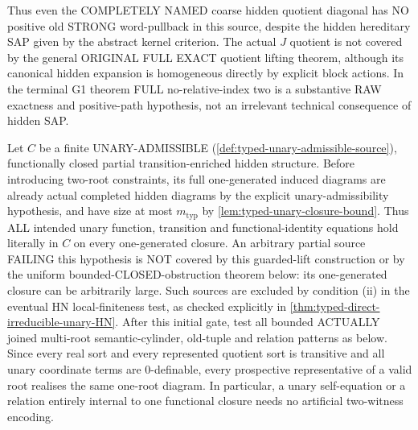 \begin{remark}
Thus even the
COMPLETELY NAMED coarse
hidden quotient diagonal
has NO positive old
STRONG word-pullback
in this source, despite
the hidden hereditary SAP
given by the abstract
kernel criterion.
The actual $J$ quotient
is not covered by the
general ORIGINAL FULL
EXACT quotient lifting
theorem, although its
canonical hidden expansion
is homogeneous directly
by explicit block actions.
In the terminal G1 theorem
FULL no-relative-index
two is a substantive
RAW exactness and
positive-path hypothesis,
not an irrelevant
technical consequence
of hidden SAP.
\end{remark}

\begin{construction}
\label{con:typed-guarded-lift}
Let \(C\) be a finite UNARY-ADMISSIBLE
(\cref{def:typed-unary-admissible-source}), functionally
closed partial transition-enriched hidden structure.
Before introducing two-root constraints, its full
one-generated induced diagrams are already actual
completed hidden diagrams by the explicit
unary-admissibility hypothesis, and have size at most
\(m_{\mathrm{typ}}\) by
\cref{lem:typed-unary-closure-bound}. Thus ALL intended
unary function, transition and functional-identity
equations hold literally in \(C\) on every
one-generated closure. An arbitrary partial source
FAILING this hypothesis is NOT covered by this
guarded-lift construction or by the uniform
bounded-CLOSED-obstruction theorem below: its
one-generated closure can be arbitrarily large.
Such sources are excluded by condition (ii) in the
eventual HN local-finiteness test, as checked explicitly
in \cref{thm:typed-direct-irreducible-unary-HN}.
After this initial gate, test all bounded
ACTUALLY joined multi-root semantic-cylinder,
old-tuple and relation patterns as below.
Since every real sort and every
represented quotient sort is transitive and all unary coordinate terms are
\(0\)-definable, every prospective representative of a valid root realises the
same one-root diagram.  In particular, a unary self-equation or a relation
entirely internal to one functional closure needs no artificial two-witness
encoding.


\end{construction}
